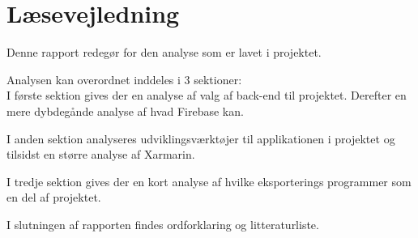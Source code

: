 \chapter*{Læsevejledning}
Denne rapport redegør for den analyse som er lavet i projektet. 

Analysen kan overordnet inddeles i 3 sektioner:\\
I første sektion gives der en analyse af valg af back-end til projektet. Derefter en mere dybdegånde analyse af hvad Firebase kan.

I anden sektion analyseres udviklingsværktøjer til applikationen i projektet og tilsidst en større analyse af Xarmarin.

I tredje sektion gives der en kort analyse af hvilke eksporterings programmer som en del af projektet.

I slutningen af rapporten findes ordforklaring og litteraturliste.
